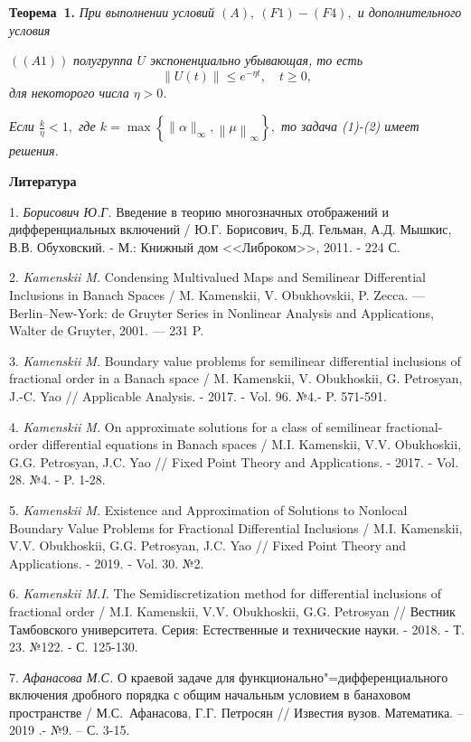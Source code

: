 \textbf{Теорема~1.} {\it При выполнении условий $(A),\ (F1) - (F4),$ и дополнительного условия}

$((A1))$ {\it полугруппа $U$ экспоненциально убывающая, то есть
$$\left\|U(t)\right\|\leq e^{-\eta t}, \quad t \geq 0,$$
для некоторого числа $\eta > 0$.}

{\it Если $\frac{k}{\eta} < 1,$ где $k=\max\left\{\|\alpha\|_\infty, \left\|\mu\right\|_{\infty}\right\},$ то задача (1)-(2) имеет решения.}


\smallskip \centerline {\bf Литература} \nopagebreak

1. {\it Борисович Ю.Г.} Введение в теорию многозначных ото\-бражений и дифференциальных включений / Ю.Г. Борисович, Б.Д. Гельман, А.Д. Мышкис, В.В. Обуховский. - М.: Книжный дом <<Либроком>>, 2011. - 224 С.


2. {\it Kamenskii M.} Condensing Multivalued Maps and Semilinear Differential Inclusions in Banach Spaces / M. Kamenskii, V. Obukhovskii, P. Zecca. --- Berlin--New-York: de Gruyter Series in Nonlinear Analysis and Applications, Walter de Gruyter, 2001. --- 231 P.

3. {\it Kamenskii M.}  Boundary value problems for semilinear differential inclusions of fractional order in a Banach space / M.  Kamenskii, V. Obukhoskii, G. Petrosyan, J.-C. Yao //  Applicable Analysis. - 2017. - Vol. 96. №4.- P. 571-591.

4. {\it Kamenskii M.}  On approximate solutions for a class of semilinear fractional-order differential equations in Banach spa\-ces / M.I. Kamenskii, V.V. Obukhoskii, G.G. Petrosyan, J.C. Yao // Fixed Point Theory and Applications. - 2017. - Vol. 28. №4. -  P. 1-28.

5. {\it Kamenskii M.}  Existence and Approximation of Solutions to Nonlocal Boundary Value Problems for  Fractional Differential Inclusions / M.I. Kamenskii, V.V. Obukhoskii, G.G. Petrosyan, J.C. Yao // Fixed Point Theory and Applications. - 2019. - Vol. 30. №2.

6. {\it Kamenskii M.I.} The Semidiscretization method for differential inclusions of fractional order / M.I. Kamenskii, V.V. Obukhoskii, G.G. Petrosyan //  Вестник Тамбовского университета. Серия: Естественные и технические науки. - 2018. - Т. 23. №122. -  С. 125-130.

7. {\it Афанасова М.С.} О краевой задаче для функционально"=дифференциального включения дробного порядка с общим начальным условием  в банаховом пространстве / \linebreak М.С.~Афанасова, Г.Г. Петросян // Известия вузов. Математика. – 2019 .- №9. – С. 3-15.

